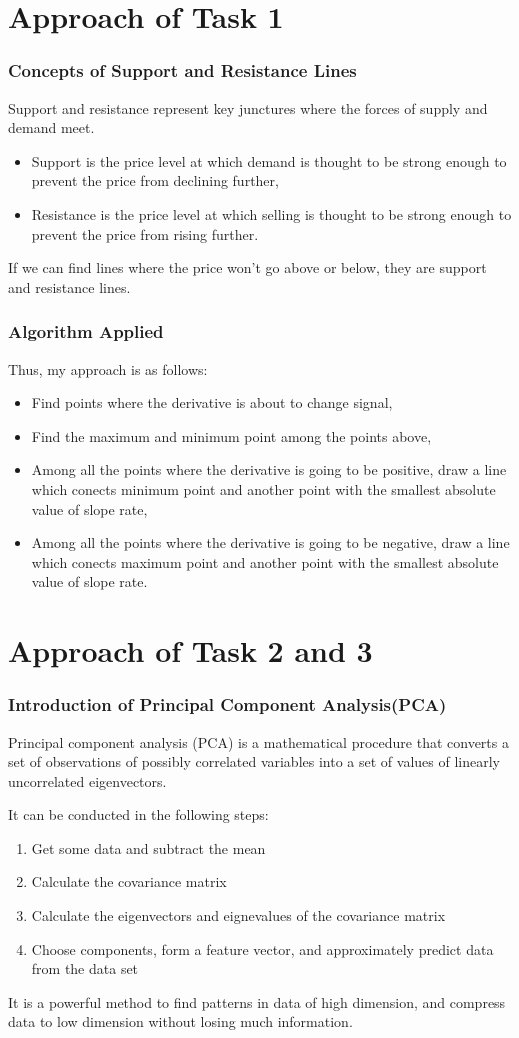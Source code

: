 \documentclass[compress,handout,10pt]{beamer}
\let\olditem\item
\renewcommand{\item}{\setlength{\itemsep}{0.5\baselineskip}\olditem}
\begin{document}
\section{Approach of Task 1}
\begin{frame}
\frametitle{Concepts of Support and Resistance Lines}
Support and resistance represent key junctures where the forces of supply and demand meet.
\begin{itemize}
\item Support is the price level at which demand is thought to be strong enough to prevent the price from declining further, 
\item Resistance is the price level at which selling is thought to be strong enough to prevent the price from rising further.
\end{itemize}
If we can find lines where the price won't go above or below, they are support and resistance lines.
\end{frame}

\begin{frame}
\frametitle{Algorithm Applied}
Thus, my approach is as follows:
\begin{itemize}
\item Find points where the  derivative is about to change signal,
\item Find the maximum and minimum point among the points above,
\item Among all the points where the derivative is going to be positive, draw a line which conects minimum point and another point with the smallest absolute value of slope rate,
\item Among all the points where the derivative is going to be negative, draw a line which conects maximum point and another point with the smallest absolute value of slope rate.
\end{itemize}
\end{frame}

\section{Approach of Task 2 and 3}
\begin{frame}
    \frametitle{Introduction of Principal Component Analysis(PCA)}
Principal component analysis (PCA) is a mathematical procedure that converts a set of observations of possibly correlated variables into a set of values of linearly uncorrelated eigenvectors. 

It can be conducted in the following steps:
	\begin{enumerate}
	\item Get some data and subtract the mean
	\item Calculate the covariance matrix 
	\item Calculate the eigenvectors and eignevalues of the covariance matrix
	\item Choose components, form a feature vector, and approximately predict data from the data set
	\end{enumerate}
It is a powerful method to find patterns in data of high dimension, and compress data to low dimension without losing much information.
\end{frame}
\end{document}
